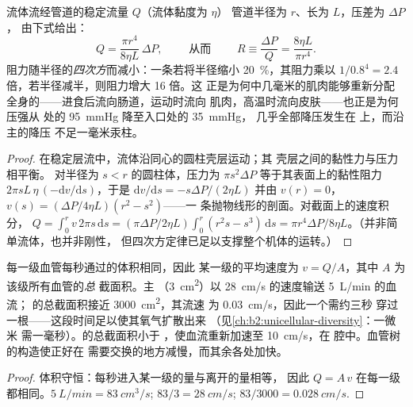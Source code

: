 \begin{theorem}[泊肃叶定律与血管阻力]\label{thm:b2:blood-circulation:poiseuille}
流体流经管道的稳定流量 $Q$（流体黏度为 $\eta$）
管道半径为 $r$、长为 $L$，压差为 $\Delta P$，
由下式给出：
\[
Q = \frac{\pi r^{4}}{8\eta L}\,\Delta P, \qquad \text{ 从而 }\qquad
R \equiv \frac{\Delta P}{Q} = \frac{8\eta L}{\pi r^{4}} .
\]
阻力随半径的\emph{四次方}而减小：一条若将半径缩小
\qty{20}{\%}，其阻力乘以
$1/0.8^{4} = 2.4$ 倍，若半径减半，则阻力增大 16 倍。这
正是为何中几毫米的肌肉能够重新分配
全身的——进食后流向肠道，运动时流向
肌肉，高温时流向皮肤——也正是为何压强从
处的 \qty{95}{mmHg} 降至入口处的 \qty{35}{mmHg}，
几乎全部降压发生在
上，而沿主的降压
不足一毫米汞柱。
\end{theorem}
\begin{proof}
在稳定层流中，流体沿同心的圆柱壳层运动；其
壳层之间的黏性力与压力相平衡。
对半径为 $s < r$ 的圆柱体，压力为 $\pi s^{2}\Delta P$
等于其表面上的黏性阻力 $2\pi s L\,\eta\,(-\mathrm{d}v/
\mathrm{d}s)$，于是 $\mathrm{d}v/\mathrm{d}s = -s\Delta P/(2\eta L)$
并由 $v(r) = 0$，$v(s) = (\Delta P/4\eta L)(r^{2} - s^{2})$——一
条抛物线形的剖面。对截面上的速度积分，
$Q = \int_{0}^{r} v\,2\pi s\,\mathrm{d}s = (\pi\Delta P/2\eta L)
\int_{0}^{r}(r^{2}s - s^{3})\,\mathrm{d}s = \pi r^{4}\Delta P/8\eta
L$。（并非简单流体，也并非刚性，
但四次方定律已足以支撑整个机体的运转。）
\end{proof}

\begin{theorem}\label{thm:b2:blood-circulation:continuity}
每一级血管每秒通过的体积相同，因此
某一级的平均速度为 $v = Q/A$，其中 $A$ 为该级所有血管的\emph{总}
截面积。主
（\qty{3}{cm^2}）以 \qty{28}{cm/s} 的速度输送 \qty{5}{L/min} 的血流；
的总截面积接近 \qty{3000}{cm^2}，其流速
为 \qty{0.03}{cm/s}，因此一个需约三秒
穿过一根——这段时间足以使其氧气扩散出来
（见\cref{ch:b2:unicellular-diversity}：一微米
需一毫秒）。的总截面积小于
，使血流重新加速至 \qty{10}{cm/s}，在
腔中。血管树的构造使正好在
需要交换的地方减慢，而其余各处加快。
\end{theorem}
\begin{proof}
体积守恒：每秒进入某一级的量与离开的量相等，
因此 $Q = A\,v$ 在每一级都相同。$\qty{5}{L/min} =
\qty{83}{cm^3/s}$; $83/3 = \qty{28}{cm/s}$; $83/3000 =
\qty{0.028}{cm/s}$.
\end{proof}

